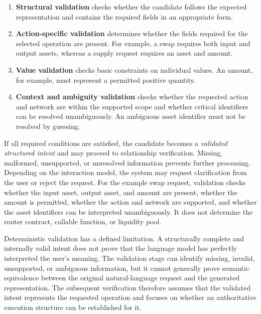\begin{enumerate}

    \item \textbf{Structural validation} checks whether the candidate follows
    the expected representation and contains the required fields in an
    appropriate form.

    \item \textbf{Action-specific validation} determines whether the fields
    required for the selected operation are present. For example, a swap
    requires both input and output assets, whereas a supply request requires
    an asset and amount.

    \item \textbf{Value validation} checks basic constraints on individual
    values. An amount, for example, must represent a permitted positive
    quantity.

    \item \textbf{Context and ambiguity validation} checks whether the
    requested action and network are within the supported scope and whether
    critical identifiers can be resolved unambiguously. An ambiguous asset
    identifier must not be resolved by guessing.

\end{enumerate}

If all required conditions are satisfied, the candidate becomes a
\textit{validated structured intent} and may proceed to relationship
verification. Missing, malformed, unsupported, or unresolved information
prevents further processing. Depending on the interaction model, the system may
request clarification from the user or reject the request. For the example swap request, validation checks whether the input asset, output
asset, and amount are present, whether the amount is permitted, whether the
action and network are supported, and whether the asset identifiers can be
interpreted unambiguously. It does not determine the router contract, callable
function, or liquidity pool.

Deterministic validation has a defined limitation. A structurally complete and
internally valid intent does not prove that the language model has perfectly
interpreted the user's meaning. The validation stage can identify missing,
invalid, unsupported, or ambiguous information, but it cannot generally prove
semantic equivalence between the original natural-language request and the
generated representation. The subsequent verification therefore assumes that
the validated intent represents the requested operation and focuses on whether
an authoritative execution structure can be established for it.


